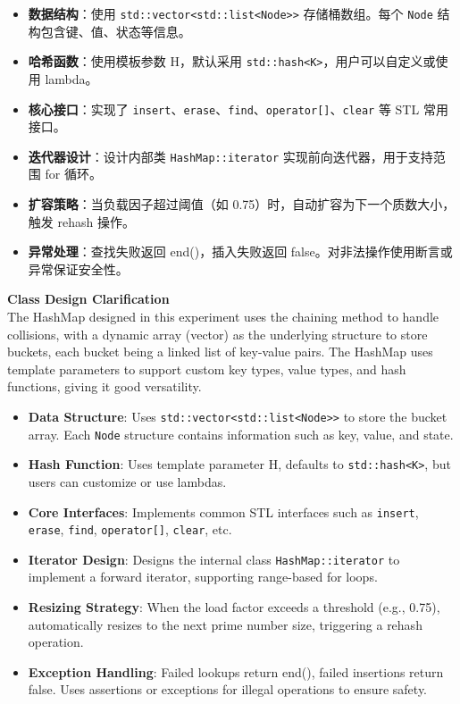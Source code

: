 \documentclass{article}
\begin{document}
\begin{itemize}
    \item \textbf{数据结构}：使用 \texttt{std::vector<std::list<Node>>} 存储桶数组。每个 \texttt{Node} 结构包含键、值、状态等信息。
    \item \textbf{哈希函数}：使用模板参数 H，默认采用 \texttt{std::hash<K>}，用户可以自定义或使用 lambda。
    \item \textbf{核心接口}：实现了 \texttt{insert}、\texttt{erase}、\texttt{find}、\texttt{operator[]}、\texttt{clear} 等 STL 常用接口。
    \item \textbf{迭代器设计}：设计内部类 \texttt{HashMap::iterator} 实现前向迭代器，用于支持范围 for 循环。
    \item \textbf{扩容策略}：当负载因子超过阈值（如 0.75）时，自动扩容为下一个质数大小，触发 rehash 操作。
    \item \textbf{异常处理}：查找失败返回 end()，插入失败返回 false。对非法操作使用断言或异常保证安全性。
\end{itemize}

    \bigskip
    \textbf{Class Design Clarification}\\
    
    The HashMap designed in this experiment uses the chaining method to handle collisions, with a dynamic array (vector) as the underlying structure to store buckets, each bucket being a linked list of key-value pairs. The HashMap uses template parameters to support custom key types, value types, and hash functions, giving it good versatility.
    
\begin{itemize}
    \item \textbf{Data Structure}: Uses \texttt{std::vector<std::list<Node>>} to store the bucket array. Each \texttt{Node} structure contains information such as key, value, and state.
    \item \textbf{Hash Function}: Uses template parameter H, defaults to \texttt{std::hash<K>}, but users can customize or use lambdas.
    \item \textbf{Core Interfaces}: Implements common STL interfaces such as \texttt{insert}, \texttt{erase}, \texttt{find}, \texttt{operator[]}, \texttt{clear}, etc.
    \item \textbf{Iterator Design}: Designs the internal class \texttt{HashMap::iterator} to implement a forward iterator, supporting range-based for loops.
    \item \textbf{Resizing Strategy}: When the load factor exceeds a threshold (e.g., 0.75), automatically resizes to the next prime number size, triggering a rehash operation.
    \item \textbf{Exception Handling}: Failed lookups return end(), failed insertions return false. Uses assertions or exceptions for illegal operations to ensure safety.
\end{itemize}
\end{document}
